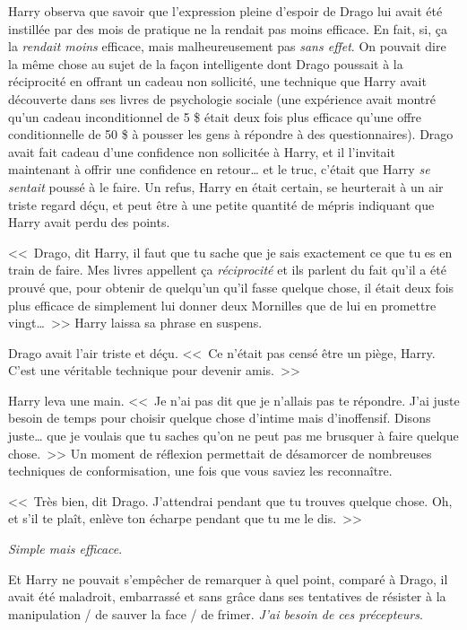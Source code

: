 Harry observa que savoir que l'expression pleine d'espoir de Drago lui avait été instillée par des mois de pratique ne la rendait pas moins efficace. En fait, si, ça la \emph{rendait moins} efficace, mais malheureusement pas \emph{sans effet}. On pouvait dire la même chose au sujet de la façon intelligente dont Drago poussait à la réciprocité en offrant un cadeau non sollicité, une technique que Harry avait découverte dans ses livres de psychologie sociale (une expérience avait montré qu'un cadeau inconditionnel de 5 \$ était deux fois plus efficace qu'une offre conditionnelle de 50 \$ à pousser les gens à répondre à des questionnaires). Drago avait fait cadeau d'une confidence non sollicitée à Harry, et il l'invitait maintenant à offrir une confidence en retour… et le truc, c'était que Harry \emph{se sentait} poussé à le faire. Un refus, Harry en était certain, se heurterait à un air triste regard déçu, et peut être à une petite quantité de mépris indiquant que Harry avait perdu des points.

<<~Drago, dit Harry, il faut que tu sache que je sais exactement ce que tu es en train de faire. Mes livres appellent ça \emph{réciprocité} et ils parlent du fait qu'il a été prouvé que, pour obtenir de quelqu'un qu'il fasse quelque chose, il était deux fois plus efficace de simplement lui donner deux Mornilles que de lui en promettre vingt…~>> Harry laissa sa phrase en suspens.

Drago avait l'air triste et déçu. <<~Ce n'était pas censé être un piège, Harry. C'est une véritable technique pour devenir amis.~>>

Harry leva une main. <<~Je n'ai pas dit que je n'allais pas te répondre. J'ai juste besoin de temps pour choisir quelque chose d'intime mais d'inoffensif. Disons juste… que je voulais que tu saches qu'on ne peut pas me brusquer à faire quelque chose.~>> Un moment de réflexion permettait de désamorcer de nombreuses techniques de conformisation, une fois que vous saviez les reconnaître.

<<~Très bien, dit Drago. J'attendrai pendant que tu trouves quelque chose. Oh, et s'il te plaît, enlève ton écharpe pendant que tu me le dis.~>>

\emph{Simple mais efficace}.

Et Harry ne pouvait s'empêcher de remarquer à quel point, comparé à Drago, il avait été maladroit, embarrassé et sans grâce dans ses tentatives de résister à la manipulation / de sauver la face / de frimer. \emph{J'ai besoin de ces précepteurs}.

